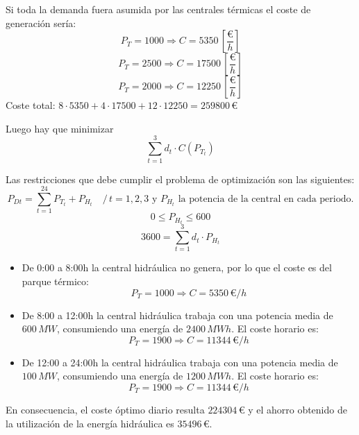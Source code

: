				
				Si toda la demanda fuera asumida por las centrales térmicas el coste de generación sería:
				\[P_T = 1000 \Rightarrow C = 5350\,\left[\dfrac{\euro}{h}\right]\]
				\[P_T = 2500 \Rightarrow C = 17500\,\left[\dfrac{\euro}{h}\right]\]
				\[P_T = 2000 \Rightarrow C = 12250\,\left[\dfrac{\euro}{h}\right]\]
				Coste total: $8\cdot 5350 + 4\cdot 17500 + 12\cdot 12250 = 259800\,\euro$
				
				
				Luego hay que minimizar
				\[\sum_{t=1}^{3}d_t\cdot C(P_{T_t})\]
				
				
				Las restricciones que debe cumplir el problema de optimización son las siguientes:
				\[P_{Dt} = \sum_{t=1}^{24} P_{T_t} + P_{H_t} \quad /\,t = 1,2,3 \text{ y } P_{H_t} \text{ la potencia de la central en cada periodo.}\]
				\[0 \leq P_{H_t} \leq 600\]
				\[3600 = \sum_{t=1}^{3}d_t\cdot P_{H_t}\]
				
				\begin{itemize}
					\item De 0:00 a 8:00h la central hidráulica no genera, por lo que el coste es del parque térmico:
						\[P_T = 1000 \Rightarrow C = 5350\,\euro/h\]
					\item De 8:00 a 12:00h la central hidráulica trabaja con una potencia media de $600\,MW$, consumiendo una energía de $2400\,MWh$. El coste horario es:
						\[P_T = 1900 \Rightarrow C = 11344\,\euro/h\]
					\item De 12:00 a 24:00h la central hidráulica trabaja con una potencia media de $100\,MW$, consumiendo una energía de $1200\,MWh$. El coste horario es:
						\[P_T = 1900 \Rightarrow C = 11344\,\euro/h\]
				\end{itemize}
				
				En consecuencia, el coste óptimo diario resulta $224304\,\euro$ y el ahorro obtenido de la utilización de la energía hidráulica es $35496\,\euro$.
				